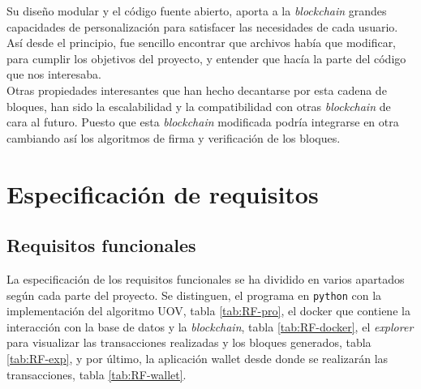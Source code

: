 Su diseño modular y el código fuente abierto, aporta a la \textit{blockchain} grandes capacidades de personalización para satisfacer las necesidades de cada usuario. Así desde el principio, fue sencillo encontrar que archivos había que modificar, para cumplir los objetivos del proyecto, y entender que hacía la parte del código que nos interesaba.\\

Otras propiedades interesantes que han hecho decantarse por esta cadena de bloques, han sido la escalabilidad y la compatibilidad con otras \textit{blockchain} de cara al futuro. Puesto que esta \textit{blockchain} modificada podría integrarse en otra cambiando así los algoritmos de firma y verificación de los bloques.\\
 
\section{Especificación de requisitos}

\subsection{Requisitos funcionales}

La especificación de los requisitos funcionales se ha dividido en varios apartados según cada parte del proyecto. Se distinguen, el programa en \texttt{python} con la implementación del algoritmo UOV, tabla \ref{tab:RF-pro}, el docker que contiene la interacción con la base de datos y la \textit{blockchain}, tabla \ref{tab:RF-docker}, el \textit{explorer} para visualizar las transacciones realizadas y los bloques generados, tabla \ref{tab:RF-exp}, y por último, la aplicación wallet desde donde se realizarán las transacciones, tabla \ref{tab:RF-wallet}.


\begin{table}[H]
	\begin{center}
	\centering
	\end{center}
	\caption{Requisitos funcionales del programa}
	\label{tab:RF-pro}
\end{table}


